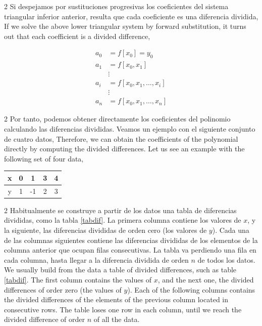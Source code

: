 \begin{paracol}{2}
Si despejamos por sustituciones progresivas los coeficientes del sistema triangular inferior anterior, resulta que cada coeficiente es una diferencia dividida,
\switchcolumn
If we solve the above lower triangular system by forward substitution, it turns out that each coefficient is a divided difference,
\end{paracol}
\begin{align*}
a_0&=f\left[x_0\right]=y_0\\
a_1&=f\left[x_0,x_1\right]\\
&\vdots\\
a_i&=f\left[x_0,x_1,\dots,x_i\right]\\
&\vdots\\
a_n&=f\left[x_0,x_1,\dots,x_n\right]
\end{align*}
\begin{paracol}{2}
Por tanto, podemos obtener directamente los coeficientes del polinomio calculando las diferencias divididas. Veamos un ejemplo con el siguiente conjunto de cuatro datos,
\switchcolumn
Therefore, we can obtain the coefficients of the polynomial directly by computing the divided differences. Let us see an example with the following set of four data,
\end{paracol}
\begin{table}[h]
\centering
\begin{tabular}{c|cccc}
x&0&1&3&4\\
\hline
y&1&-1&2&3
\end{tabular}
\end{table}
\begin{paracol}{2}
Habitualmente se construye a partir de los datos una tabla de diferencias divididas, como la tabla \ref{tabdif}. La primera columna contiene los valores de $x$, y la siguiente, las diferencias divididas de orden cero (los valores de $y$). Cada una de las columnas siguientes contiene las diferencias divididas de los elementos de la columna anterior que ocupan filas consecutivas. La tabla va perdiendo una fila en cada columna, hasta llegar a la diferencia dividida de orden $n$ de todos los datos.
\switchcolumn
We usually build from the data a table of divided differences, such as table \ref{tabdif}. The first column contains the values of $x$, and the next one, the divided differences of order zero (the values of $y$). Each of the following columns contains the divided differences of the elements of the previous column located in consecutive rows. The table loses one row in each column, until we reach the divided difference of order $n$ of all the data.
\end{paracol}
